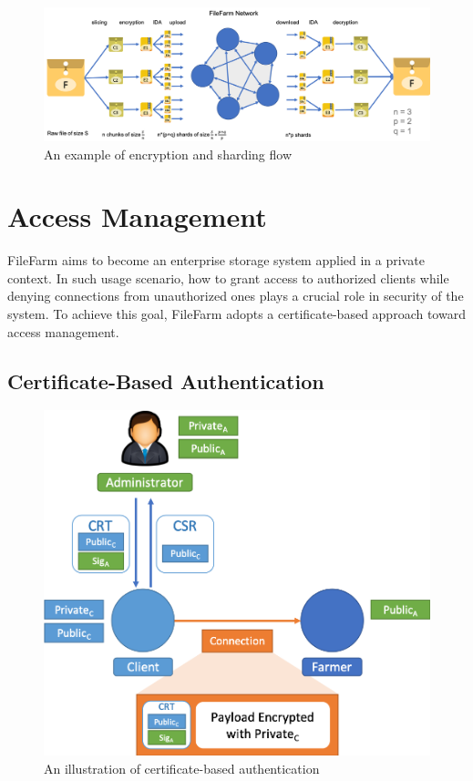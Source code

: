 \begin{figure}[hbt]
\centering
  \includegraphics[width=15cm]{figures/data_confidentiality.png}
  \caption{An example of encryption and sharding flow}
  \label{fig:dataconfidentiality}
\end{figure}

\newpage

\section{Access Management}
\label{s:accessmanagement}

FileFarm aims to become an enterprise storage system applied in a private context. In such usage scenario, how to grant access to authorized clients while denying connections from unauthorized ones plays a crucial role in security of the system. To achieve this goal, FileFarm adopts a certificate-based approach toward access management.

\subsection{Certificate-Based Authentication}
\label{ss:certificatebasedauthentication}

\begin{figure}[hbt]
\centering
  \includegraphics[width=14cm]{figures/access_management.png}
  \caption{An illustration of certificate-based authentication}
  \label{fig:accessmanagement}
\end{figure}

